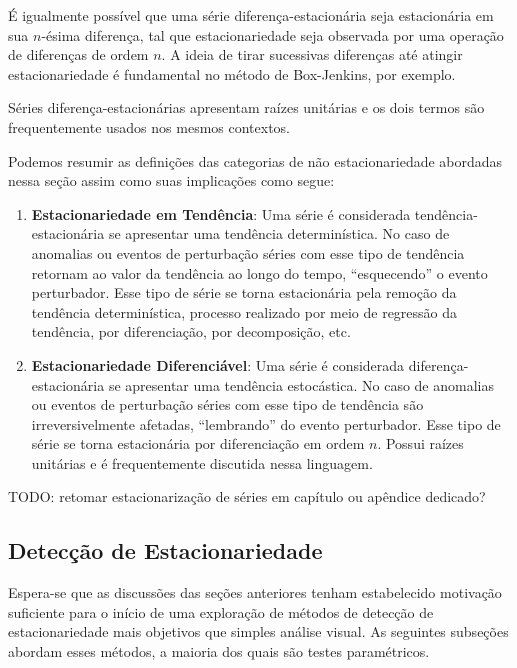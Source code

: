 É igualmente possível que uma série diferença-estacionária seja estacionária em
sua $n$-ésima diferença, tal que estacionariedade seja observada por uma
operação de diferenças de ordem $n$. A ideia de tirar sucessivas diferenças
até atingir estacionariedade é fundamental no método de Box-Jenkins, por
exemplo.

Séries diferença-estacionárias apresentam raízes unitárias e os dois termos são
frequentemente usados nos mesmos contextos.

Podemos resumir as definições das categorias de não estacionariedade abordadas
nessa seção assim como suas implicações como segue:

\begin{enumerate}
    \item \textbf{Estacionariedade em Tendência}: Uma série é considerada
        tendência-estacionária se apresentar uma tendência determinística. No
        caso de anomalias ou eventos de perturbação séries com esse tipo de
        tendência retornam ao valor da tendência ao longo do tempo,
        ``esquecendo'' o evento perturbador. Esse tipo de série se torna
        estacionária pela remoção da tendência determinística, processo
        realizado por meio de regressão da tendência, por diferenciação, por
        decomposição, etc.
    \item \textbf{Estacionariedade Diferenciável}: Uma série é considerada
        diferença-estacionária se apresentar uma tendência estocástica. No
        caso de anomalias ou eventos de perturbação séries com esse tipo de
        tendência são irreversivelmente afetadas,
        ``lembrando'' do evento perturbador. Esse tipo de série se torna
        estacionária por diferenciação em ordem $n$. Possui raízes unitárias
        e é frequentemente discutida nessa linguagem.

\end{enumerate}

TODO: retomar estacionarização de séries em capítulo ou apêndice dedicado?

\subsection{Detecção de Estacionariedade}\label{ssec:stationarity_tests}

Espera-se que as discussões das seções anteriores tenham estabelecido motivação
suficiente para o início de uma exploração de métodos de detecção de
estacionariedade mais objetivos que simples análise visual. As seguintes
subseções abordam esses métodos, a maioria dos quais são testes paramétricos.

